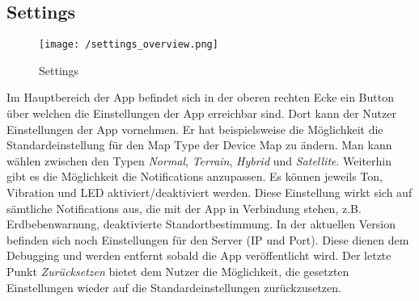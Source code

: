 \subsection{Settings}
\begin{wrapfigure}{r}{40mm}
\vspace{-5mm}
\texttt{[image: /settings\_overview.png]}
\vspace{-10mm}
\caption[User Interface: Settings]{Settings}
\vspace{-5mm}
\end{wrapfigure}
Im Hauptbereich der App befindet sich in der oberen rechten Ecke ein Button über welchen die Einstellungen der App erreichbar sind. Dort kann der Nutzer Einstellungen der App vornehmen.
Er hat beispielsweise die Möglichkeit die Standardeinstellung für den Map Type der Device Map zu ändern. Man kann wählen zwischen den Typen \textit{Normal}, \textit{Terrain}, \textit{Hybrid} und \textit{Satellite}. Weiterhin gibt es die Möglichkeit die Notifications anzupassen. Es können jeweils Ton, Vibration und LED aktiviert/deaktiviert werden. Diese Einstellung wirkt sich auf sämtliche Notifications aus, die mit der App in Verbindung stehen, z.B. Erdbebenwarnung, deaktivierte Standortbestimmung.
In der aktuellen Version befinden sich noch Einstellungen für den Server (IP und Port). Diese dienen dem Debugging und werden entfernt sobald die App veröffentlicht wird.
Der letzte Punkt \textit{Zurücksetzen} bietet dem Nutzer die Möglichkeit, die gesetzten Einstellungen wieder auf die Standardeinstellungen zurückzusetzen.



